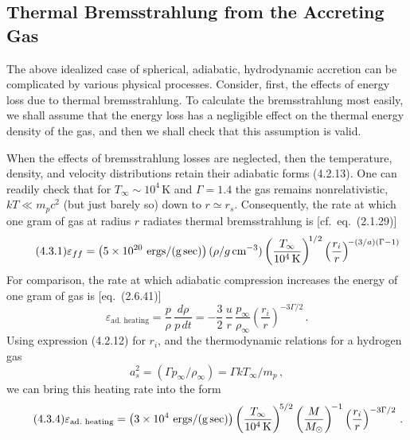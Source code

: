 

\subsection{Thermal Bremsstrahlung from the Accreting Gas}
\label{sec:4.3}

The above idealized case of spherical, adiabatic, hydrodynamic accretion can be
complicated by various physical processes.  Consider, first, the effects of energy
loss due to thermal bremsstrahlung.  To calculate the bremsstrahlung most easily,
we shall assume that the energy loss has a negligible effect on the thermal energy
density of the gas, and then we shall check that this assumption is valid.

When the effects of bremsstrahlung losses are neglected, then the temperature,
density, and velocity distributions retain their adiabatic forms (4.2.13).  One can
readily check that for $T_\infty \sim 10^4$\,K and $\Gamma = 1.4$ the gas remains nonrelativistic,
$kT \ll m_p c^2$ (but just barely so) down to $r \simeq r_s$.  Consequently, the rate at which
one gram of gas at radius $r$ radiates thermal bremsstrahlung is [cf.\ eq.~(2.1.29)]
%
\begin{equation}
\tag{4.3.1}
\varepsilon_{ff}
= \bigl(5 \times 10^{20}~\text{ergs/(g\,sec)}\bigr)\,
  (\rho / g\,\text{cm}^{-3})
  \left(\frac{T_\infty}{10^4\,\text{K}}\right)^{\!1/2}
  \left(\frac{r_i}{r}\right)^{\!-(3/a)(\Gamma-1)}
\end{equation}
%
For comparison, the rate at which adiabatic compression increases the energy of
one gram of gas is [eq.~(2.6.41)]
%
\begin{equation}
\tag{4.3.2}
\varepsilon_{\text{ad.\ heating}}
= \frac{p}{\rho}\,\frac{d\rho}{p\,dt}
= -\frac{3}{2}\,\frac{u}{r}\,\frac{p_\infty}{\rho_\infty}
  \left(\frac{r_i}{r}\right)^{-3\Gamma/2}\,.
\end{equation}
%
Using expression (4.2.12) for $r_i$, and the thermodynamic relations for a hydro\-gen gas
%
\begin{equation}
\tag{4.3.3}
a_s^2 = (\Gamma p_\infty / \rho_\infty) = \Gamma kT_\infty / m_p\,,
\end{equation}
%
we can bring this heating rate into the form
%
\begin{equation}
\tag{4.3.4}
\varepsilon_{\text{ad.\ heating}}
= \bigl(3 \times 10^4~\text{ergs}/(\text{g\,sec})\bigr)
  \left(\frac{T_\infty}{10^4\,\text{K}}\right)^{\!5/2}
  \left(\frac{M}{M_\odot}\right)^{\!-1}
  \left(\frac{r_i}{r}\right)^{-3\Gamma/2}\,.
\end{equation}

